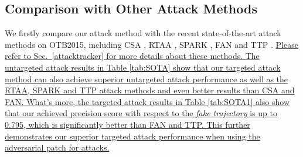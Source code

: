 \documentclass[journal]{IEEEtran}
\begin{document}
\subsection{Comparison with Other Attack Methods}\label{SOTA}

We firstly compare our attack method with the recent state-of-the-art attack methods on OTB2015, including CSA \cite{CSA}, RTAA \cite{RTAA}, SPARK \cite{SPARK}, FAN \cite{FAN} and TTP \cite{TTP}. \uline{Please refer to Sec.~\ref{attacktracker} for more details about these methods. The untargeted attack results in Table \ref{tab:SOTA} show that our targeted attack method can also achieve superior untargeted attack performance as well as the RTAA, SPARK and TTP attack methods and even better results than CSA and FAN. What's more, the targeted attack results in Table \ref{tab:SOTA1} also show that our achieved precision score with respect to the \textit{fake trajectory} is up to 0.795, which is significantly better than FAN and TTP. This further demonstrates our superior targeted attack performance when using the adversarial patch for attacks.}
\end{document}
